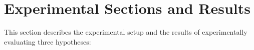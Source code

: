 \section{Experimental Sections and Results}
\label{sec:exp-setup-results}
This section describes the experimental setup and the results of experimentally evaluating three hypotheses:
